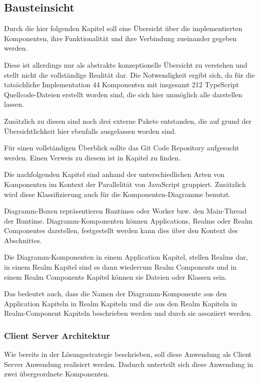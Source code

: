\subsection{Bausteinsicht}

Durch die hier folgenden Kapitel soll eine Übersicht über die implementierten Komponenten, ihre Funktionalität und ihre Verbindung zueinander gegeben werden.

Diese ist allerdings nur als abstrakte konzeptionelle Übersicht zu verstehen und stellt nicht die vollständige Realität dar.
Die Notwendigkeit ergibt sich, da für die tatsächliche Implementation 44 Komponenten mit insgesamt 212 TypeScript Quellcode-Dateien erstellt worden sind, die sich hier unmöglich alle darstellen lassen.

Zusätzlich zu diesen sind noch drei externe Pakete entstanden, die auf grund der Übersichtlichkeit hier ebenfalls ausgelassen worden sind.

Für einen vollständigen Überblick sollte das Git Code Repository aufgesucht werden.
Einen Verweis zu diesem ist in Kapitel  zu finden.

Die nachfolgenden Kapitel sind anhand der unterschiedlichen Arten von Komponenten im Kontext der Parallelität von JavaScript gruppiert.
Zusätzlich wird diese Klassifizierung auch für die Komponenten-Diagramme benutzt.

Diagramm-Boxen repräsentieren Runtimes oder Worker bzw. den Main-Thread der Runtime.
Diagramm-Komponenten können Applications, Realms oder Realm Componentes darstellen, festgestellt werden kann dies über den Kontext des Abschnittes.

Die Diagramm-Komponenten in einem Application Kapitel, stellen Realms dar, in einem Realm Kapitel sind es dann wiederrum Realm Components und in einem Realm Components Kapitel können sie Dateien oder Klassen sein.

Das bedeutet auch, dass die Namen der Diagramm-Komponente aus den Application Kapiteln in Realm Kapiteln und die aus den Realm Kapiteln in Realm-Component Kapiteln beschrieben werden und durch sie assoziiert werden.

\subsubsection{Client Server Architektur}
\label{sec:client-server-arch}

Wie bereits in der Lösungsstrategie beschrieben, soll diese Anwendung als Client Server Anwendung realisiert werden.
Dadurch unterteilt sich diese Anwendung in zwei übergeordnete Komponenten.


